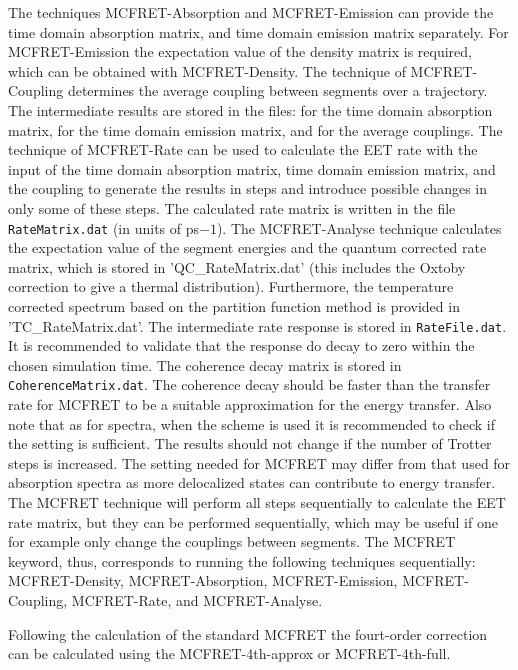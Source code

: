 The techniques MCFRET-Absorption and MCFRET-Emission can provide the time domain
absorption matrix, and time domain emission matrix separately.
For MCFRET-Emission the expectation value of the density matrix is required, which
can be obtained with MCFRET-Density. The technique of MCFRET-Coupling determines the
average coupling between segments over a trajectory. The intermediate results are
stored in the files:
 for the time domain absorption matrix,
 for the time domain emission matrix, and
 for the average couplings. 
The technique of MCFRET-Rate can be used to calculate the EET rate with the input of
the time domain absorption matrix, time domain emission matrix, and the coupling to
generate the results in steps and introduce possible changes in only some of these
steps.  The calculated rate matrix is written in the file {\tt RateMatrix.dat} (in
units of ps${-1}$). The MCFRET-Analyse technique calculates the expectation value of 
the segment energies and the quantum corrected rate matrix, which is stored in
'QC\_RateMatrix.dat' (this includes the Oxtoby correction to give a thermal
distribution). Furthermore, the temperature corrected spectrum based on the
partition function method is provided in 'TC\_RateMatrix.dat'.
The intermediate  rate response is stored in {\tt RateFile.dat}. It is
recommended to validate that the response do decay to zero within the chosen
simulation time. The coherence decay matrix is stored in {\tt CoherenceMatrix.dat}.
The coherence decay should be faster than the transfer rate for MCFRET to be a
suitable approximation for the energy transfer. Also note that as for spectra, when
the  scheme  is used it is recommended to check if
the  setting is sufficient. The results should not change if the
number of Trotter steps is increased. The  setting needed for MCFRET may
differ from that used for absorption spectra as more delocalized states can contribute
to energy transfer. The MCFRET technique will perform all steps sequentially to
calculate the EET rate matrix, but they can be performed sequentially, which may be
useful if one for example only change the couplings between segments. 
The MCFRET keyword, thus, corresponds to running the following techniques
sequentially: MCFRET-Density, MCFRET-Absorption, MCFRET-Emission, MCFRET-Coupling,
MCFRET-Rate, and MCFRET-Analyse.

Following the calculation of the standard MCFRET the fourt-order correction can be
calculated using the  MCFRET-4th-approx or MCFRET-4th-full.

